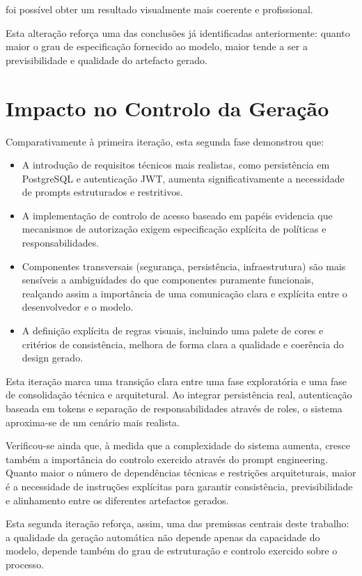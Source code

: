foi possível obter um resultado visualmente mais coerente e profissional.

Esta alteração reforça uma das conclusões já identificadas anteriormente: quanto maior o grau de especificação fornecido ao modelo, maior tende a ser a previsibilidade e qualidade do artefacto gerado.

\section{Impacto no Controlo da Geração}

Comparativamente à primeira iteração, esta segunda fase demonstrou que:

\begin{itemize}
  \item A introdução de requisitos técnicos mais realistas, como persistência em PostgreSQL e autenticação JWT, aumenta significativamente a necessidade de prompts estruturados e restritivos.
  \item A implementação de controlo de acesso baseado em papéis evidencia que mecanismos de autorização exigem especificação explícita de políticas e responsabilidades.
  \item Componentes transversais (segurança, persistência, infraestrutura) são mais sensíveis a ambiguidades do que componentes puramente funcionais, realçando assim a importância de uma comunicação clara e explícita entre o desenvolvedor e o modelo.
  \item A definição explícita de regras visuais, incluindo uma palete de cores e critérios de consistência, melhora de forma clara a qualidade e coerência do design gerado.
\end{itemize}

Esta iteração marca uma transição clara entre uma fase exploratória e uma fase de consolidação técnica e arquitetural. Ao integrar persistência real, autenticação baseada em tokens e separação de responsabilidades através de roles, o sistema aproxima-se de um cenário mais realista.

Verificou-se ainda que, à medida que a complexidade do sistema aumenta, cresce também a importância do controlo exercido através do prompt engineering. Quanto maior o número de dependências técnicas e restrições arquiteturais, maior é a necessidade de instruções explícitas para garantir consistência, previsibilidade e alinhamento entre os diferentes artefactos gerados.

Esta segunda iteração reforça, assim, uma das premissas centrais deste trabalho: a qualidade da geração automática não depende apenas da capacidade do modelo, depende também do grau de estruturação e controlo exercido sobre o processo.

